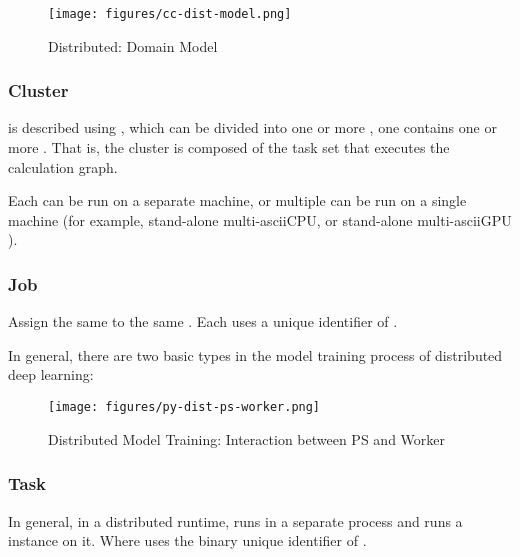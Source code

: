\begin{content}
\begin{figure}[H]
  \centering
  \texttt{[image: figures/cc-dist-model.png]}
  \caption{Distributed: Domain Model}
  \label{fig:cc-dist-model}
\end{figure}


\subsubsection{Cluster}
 is described using , which can be divided into one or more , one  contains one or more . That is, the  cluster is composed of the task set  that executes the calculation graph.

Each  can be run on a separate machine, or multiple  can be run on a single machine (for example, stand-alone multi-ascii{CPU}, or stand-alone multi-ascii{GPU} ).


\subsubsection{Job}
Assign the same  to the same . Each  uses a unique identifier of .

In general, there are two basic  types in the model training process of distributed deep learning:

\begin{enum}
\end{enum}

\begin{figure}[H]
  \centering
  \texttt{[image: figures/py-dist-ps-worker.png]}
  \caption{Distributed Model Training: Interaction between PS and Worker}
  \label{fig:py-dist-ps-worker}
\end{figure}


\subsubsection{Task}
In general, in a distributed runtime,  runs in a separate process and runs a  instance on it. Where  uses the binary unique identifier of .



\end{content}
